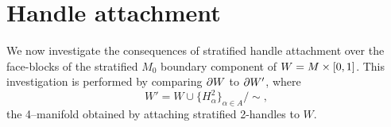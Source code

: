 \section{Handle attachment}

We now investigate the consequences of stratified handle attachment over the face-blocks of the stratified $M_0$ boundary component of $W=M\times[0,1]$.
This investigation is performed by comparing $\partial W$ to $\partial W'$, where
\[
	W' = W\cup\{H_\alpha^2\}_{\alpha\in A} / \sim,
\]
the 4--manifold obtained by attaching stratified 2-handles to $W$.